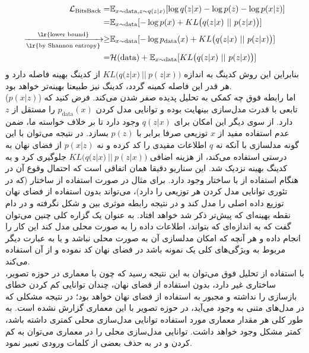 \begin{align}
	\mathcal{L}_{\text{BitsBack}} =                                            & \expected_{x \sim \text{data}, z \sim q(z|x)} [\log q(z|x) -\log p(z) - \log p(x|z)] \nonumber
	\\
	=                                                                          & \expected_{x \sim \text{data}} [-\log p(x) + KL\big(q(z|x) ~||~ p(z|x)\big)] \nonumber
	\\
	\xrightarrow[\text{\lr{by Shannon entropy}}]{\text{\lr{lower bound}}} \geq & \expected_{x \sim \text{data}} [-\log p_{\text{data}}(x) + KL\big(q(z|x) ~||~ p(z|x)\big)] \nonumber
	\\
	=                                                                          & \mathcal{H}(\text{data}) + \expected_{x \sim \text{data}} [KL\big(q(z|x) ~||~ p(z|x)\big)]
\end{align}
بنابراین این روش کدینگ به اندازه
$KL\big(q(z|x) ~||~ p(z|x)\big)$
از کدینگ بهینه فاصله دارد و هر قدر این فاصله کمینه گردد، کدینگ نیز طبیعتا بهینه‌تر خواهد بود. \\
اما رابطه فوق چه کمکی به تحلیل پدیده صفر شدن  می‌کند. فرض کنید که \decoder{}
($p(x|z)$)
تابعی با قدرت مدل‌سازی بینهایت بوده و توانایی مدل کردن $p_{\text{data}}(x)$ را مستقل از $z$ دارد. از سوی دیگر این امکان برای $q(z|x)$ وجود دارد تا بر خلاف خواسته ما، ضمن عدم استفاده مفید از $x$ توزیعی صرفا برابر با $p(z)$ بسازد. در نتیجه می‌توان با این گونه مدلسازی با آنکه نه $q$ اطلاعات مفیدی را کد کرده و نه $p(x|z)$ از فضای نهان به درستی استفاده می‌کند، از هزینه اضافی
$KL\big(q(z|x) ~||~ p(z|x)\big)$
جلوگیری کرد و به کدینگ بهینه نزدیک شد. این سناریو دقیقا همان اتفاقی است که احتمال وقوع آن در هنگام استفاده از \decoder{} با ساختار \autoregressive{} وجود دارد. برای مثال در صورت استفاده از ساختار  (که در تئوری توانایی مدل کردن هر توزیعی را دارد)، \decoder{} می‌تواند بدون استفاده از فضای نهان توزیع داده اصلی را مدل کند و در نتیجه رابطه موثری بین \decoder{} و \encoder{} شکل نگرفته و در دام نقطه بهینه‌ای که پیش‌تر ذکر شد خواهد افتاد. به عنوان یک گزاره کلی چنین می‌توان گفت که \decoder{} به اندازه‌ای که بتواند، اطلاعات داده را به صورت محلی مدل کند این کار را انجام داده و هر آنچه که امکان مدلسازی آن به صورت محلی نباشد و یا به عبارت دیگر مربوط به ویژگی‌های کلی یک نمونه باشد در فضای نهان کد نموده و از آن استفاده می‌کند.
\\
با استفاده از تحلیل فوق می‌توان به این نتیجه رسید که چون \vae{} با معماری  در حوزه تصویر، ساختاری  غیر \autoregressive{} دارد، بدون استفاده از فضای نهان، چندان توانایی کم کردن خطای بازسازی را نداشته و مجبور به استفاده از فضای نهان خواهد بود؛ در نتیجه مشکلی که در مدل‌های متنی به وجود می‌آید، در حوزه تصویر با این معماری گزارش نشده است. به طور کلی هر مقدار معماری مورد استفاده توانایی مدل‌سازی محلی کمتری داشته باشد، کمتر مشکل وجود خواهد داشت. توانایی مدل‌سازی محلی را در معماری  می‌توان به کم کردن \receiptivefield{} و در  به حذف بعضی از کلمات ورودی تعبیر نمود.

